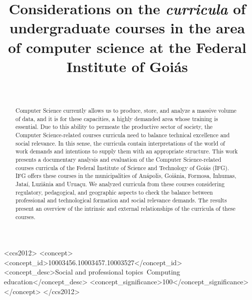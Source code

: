 \documentclass[sigconf, review]{educomp}
\begin{document}
\title[Computer Science undergraduate curricula at IFG]{Considerations on the \textit{curricula} of undergraduate courses in the area of computer science at the Federal Institute of Goi\'as}


\author{~}
\email{~}
\affiliation{%
  \institution{~}
}

\renewcommand{\shortauthors}{-}

\newcommand{\showDOI}[1]{\unskip}


\begin{abstract}
Computer Science currently allows us to produce, store, and analyze a massive volume of data, and it is for these capacities, a highly demanded area whose training is essential. 
Due to this ability to permeate the productive sector of society, the Computer Science-related courses curricula need to balance technical excellence and social relevance. 
In this sense, the curricula contain interpretations of the world of work demands and intentions to supply them with an appropriate structure. 
This work presents a documentary analysis and evaluation of the Computer Science-related courses curricula of the Federal Institute of Science and Technology of Goiás (IFG).
IFG offers these courses in the municipalities of Anápolis, Goiânia, Formosa, Inhumas, Jataí, Luziânia and Uruaçu. 
We analyzed curricula from these courses considering regulatory, pedagogical, and geographic aspects to check the balance between professional and technological formation and social relevance demands.
The results present an overview of the intrinsic and external relationships of the curricula of these courses.
\end{abstract}

\begin{CCSXML}
<ccs2012>
<concept>
<concept_id>10003456.10003457.10003527</concept_id>
<concept_desc>Social and professional topics~Computing education</concept_desc>
<concept_significance>100</concept_significance>
</concept>
</ccs2012>
\end{CCSXML}
\end{document}
